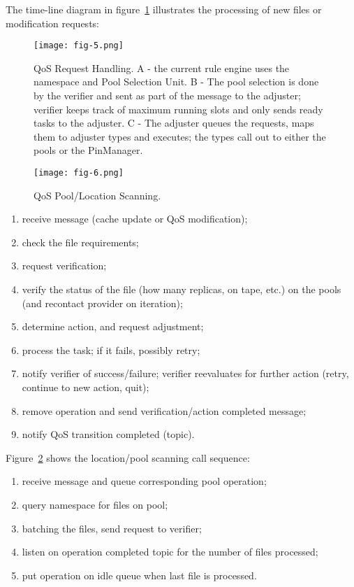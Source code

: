 \documentclass{webofc}
\begin{document}
The time-line diagram in figure~\ref{fig-5} illustrates the processing of new files or modification requests:
\begin{figure}[h]
\centering
\texttt{[image: fig-5.png]}
\caption{QoS Request Handling. A - the current rule engine uses the namespace and Pool Selection Unit. B - The pool selection is done by the verifier and sent as part of the message to the adjuster; verifier keeps track of maximum running slots and only sends ready tasks to the adjuster.
C - The adjuster queues the requests, maps them to adjuster types and executes; the types call out to either the pools or the PinManager.}
\label{fig-5} 
\end{figure}
\begin{figure}[h]
\centering
\texttt{[image: fig-6.png]}
\caption{QoS Pool/Location Scanning. }
\label{fig-6} 
\end{figure}
\begin{enumerate}
\item receive message (cache update or QoS modification);
\item check the file requirements;
\item request verification;
\item verify the status of the file (how many replicas, on tape, etc.) on the pools (and recontact provider on iteration);
\item determine action, and request adjustment;
\item process the task; if it fails, possibly retry;
\item notify verifier of success/failure; verifier reevaluates for further action (retry, continue to new action, quit);
\item remove operation and send verification/action completed message;
\item notify QoS transition completed (topic).
\end{enumerate}
Figure~\ref{fig-6} shows the location/pool scanning call sequence:
\begin{enumerate}
\item receive message and queue corresponding pool operation;
\item query namespace for files on pool;
\item batching the files, send request to verifier;
\item listen on operation completed topic for the number of files processed;
\item put operation on idle queue when last file is processed.
\end{enumerate}
\end{document}
